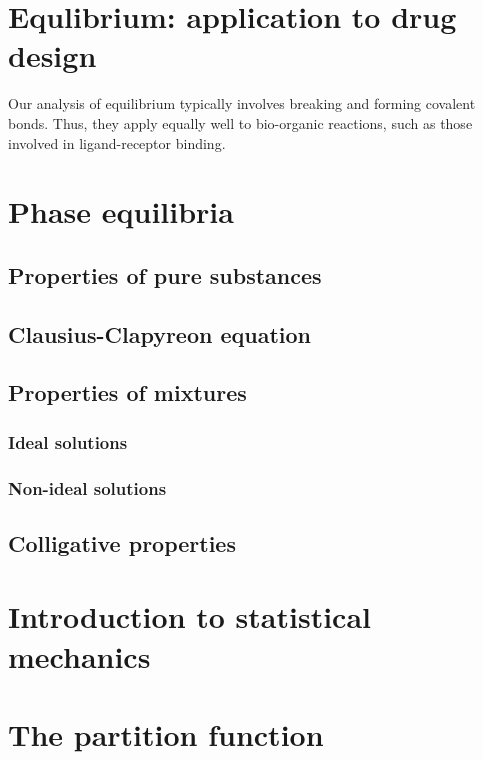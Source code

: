 \documentclass{article}
\numberwithin{theorem}{section}
\numberwithin{corollary}{section}
\numberwithin{postulate}{section}
\numberwithin{lemma}{section}
\numberwithin{definition}{section}
\begin{document}
\section{Equlibrium: application to drug design}

Our analysis of equilibrium typically involves breaking and forming covalent
bonds. Thus, they apply equally well to bio-organic reactions, such as those
involved in ligand-receptor binding.

\section{Phase equilibria}

\subsection{Properties of pure substances}

\subsection{Clausius-Clapyreon equation}

\subsection{Properties of mixtures}

\subsubsection{Ideal solutions}

\subsubsection{Non-ideal solutions}

\subsection{Colligative properties}

\section{Introduction to statistical mechanics}

\section{The partition function}
\end{document}
